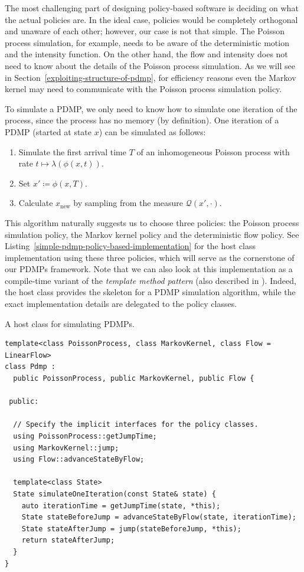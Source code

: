 \documentclass[report.tex]{subfiles}
\begin{document}
The most challenging part of designing policy-based software is deciding on
what the actual policies are.
In the ideal case, policies would be completely orthogonal and unaware of each
other; however, our case is not that simple.
The Poisson process simulation, for example, needs to be aware of the deterministic
motion and the intensity function. On the other hand, the flow and intensity does
not need to know about the details of the Poisson process simulation.
As we will see in Section~\ref{exploiting-structure-of-pdmp}, for efficiency
reasons even the Markov kernel may need to communicate with the Poisson process simulation
policy.

To simulate a PDMP, we only need to know how to simulate one iteration of the process,
since the process has no memory (by definition).
One iteration of a PDMP (started at state $x$) can be simulated as follows:
\begin{enumerate}
  \item Simulate the first arrival time $T$ of an inhomogeneous Poisson process with
        rate \mbox{$t \mapsto \lambda(\phi(x, t))$}.
  \item Set $x' \coloneqq \phi(x, T)$.
  \item Calculate $x_{\text{new}}$ by sampling from the measure $\mathcal{Q}(x', \cdot)$.
\end{enumerate}
This algorithm naturally suggests us to choose three policies: the Poisson process simulation policy,
the Markov kernel policy and the deterministic flow policy.
See Listing~\ref{simple-pdmp-policy-based-implementation}
for the host class implementation using these three policies, which will serve as the
cornerstone of our PDMPs framework.
Note that we can also look at this implementation as a compile-time variant of the
\textit{template method pattern} (also described in \cite{gamma1994design}).
Indeed, the host class provides the skeleton for a PDMP simulation algorithm,
while the exact implementation details are delegated to the policy classes.

\begin{lstfloat}
\caption{A host class for simulating PDMPs.}
\label{simple-pdmp-policy-based-implementation}
\begin{lstlisting}
template<class PoissonProcess, class MarkovKernel, class Flow = LinearFlow>
class Pdmp :
  public PoissonProcess, public MarkovKernel, public Flow {

 public:

  // Specify the implicit interfaces for the policy classes.
  using PoissonProcess::getJumpTime;
  using MarkovKernel::jump;
  using Flow::advanceStateByFlow;

  template<class State>
  State simulateOneIteration(const State& state) {
    auto iterationTime = getJumpTime(state, *this);
    State stateBeforeJump = advanceStateByFlow(state, iterationTime);
    State stateAfterJump = jump(stateBeforeJump, *this);
    return stateAfterJump;
  }
}
\end{lstlisting}
\end{lstfloat}
\end{document}
